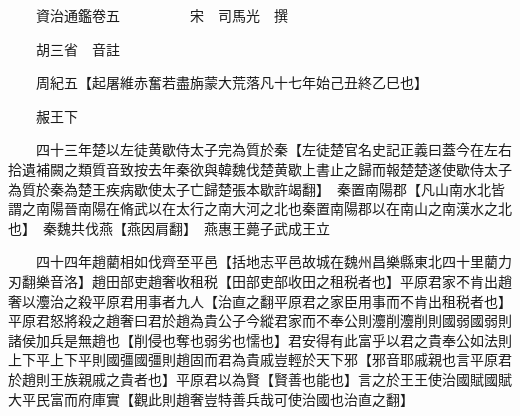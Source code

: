 










 


 
 


 

  
  
  
  
  





  
  
  
  
  
 
  

  

  
  
  



  

 
 

  
   




  

  
  


  　　資治通鑑卷五　　　　　宋　司馬光　撰

　　胡三省　音註

　　周紀五【起屠維赤奮若盡旃蒙大荒落凡十七年始己丑終乙巳也】

　　赧王下

　　四十三年楚以左徒黄歇侍太子完為質於秦【左徒楚官名史記正義曰蓋今在左右拾遺補闕之類質音致按去年秦欲與韓魏伐楚黄歇上書止之歸而報楚楚遂使歇侍太子為質於秦為楚王疾病歇使太子亡歸楚張本歇許竭翻】　秦置南陽郡【凡山南水北皆謂之南陽晉南陽在脩武以在太行之南大河之北也秦置南陽郡以在南山之南漢水之北也】　秦魏共伐燕【燕因肩翻】　燕惠王薨子武成王立

　　四十四年趙藺相如伐齊至平邑【括地志平邑故城在魏州昌樂縣東北四十里藺力刃翻樂音洛】趙田部吏趙奢收租税【田部吏部收田之租税者也】平原君家不肯出趙奢以灋治之殺平原君用事者九人【治直之翻平原君之家臣用事而不肯出租税者也】平原君怒將殺之趙奢曰君於趙為貴公子今縱君家而不奉公則灋削灋削則國弱國弱則諸侯加兵是無趙也【削侵也奪也弱劣也懦也】君安得有此富乎以君之貴奉公如法則上下平上下平則國彊國彊則趙固而君為貴戚豈輕於天下邪【邪音耶戚親也言平原君於趙則王族親戚之貴者也】平原君以為賢【賢善也能也】言之於王王使治國賦國賦大平民富而府庫實【觀此則趙奢豈特善兵哉可使治國也治直之翻】

